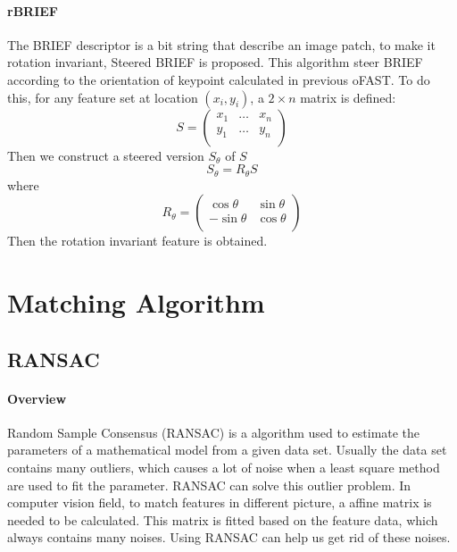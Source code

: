 \documentclass[paper=a4, fontsize=11pt]{scrartcl} %
\numberwithin{equation}{section} %
\numberwithin{figure}{section} %
\numberwithin{table}{section} %
\begin{document}
\paragraph{rBRIEF}
The BRIEF descriptor is a bit string that describe an image patch, to make it rotation invariant, Steered BRIEF is proposed. 
This algorithm steer BRIEF according to the orientation of keypoint calculated in previous oFAST.
To do this, for any feature set at location $(x_i, y_i)$, a $2 \times n$ matrix is defined:
$$
S = 
\begin{pmatrix}
x_1&\dots&x_n \\
y_1&\dots&y_n \\
\end{pmatrix}
$$
Then we construct a steered version $S_\theta$ of $S$
$$
S_\theta = R_\theta S
$$
where 
$$
R_\theta = 
\begin{pmatrix}
\cos \theta & \sin \theta \\
-\sin \theta & \cos \theta \\
\end{pmatrix}
$$
Then the rotation invariant feature is obtained.



\section{Matching Algorithm}


\subsection{RANSAC}
\paragraph{Overview}
Random Sample Consensus (RANSAC) is a algorithm used to estimate the parameters of a mathematical model from a given data set.
Usually the data set contains many outliers, which causes a lot of noise when a least square method are used to fit the parameter.
RANSAC can solve this outlier problem.
In computer vision field, to match features in different picture, a affine matrix is needed to be calculated.
This matrix is fitted based on the feature data, which always contains many noises.
Using RANSAC can help us get rid of these noises.
\end{document}
